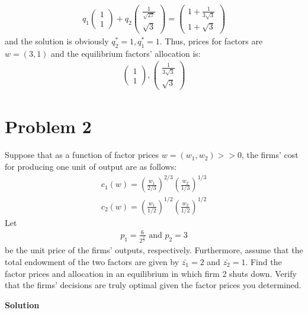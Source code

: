 \documentclass[a4paper]{article}
\begin{document}
\begin{align*}
q_1 \begin{pmatrix}
1\\
1
\end{pmatrix} + q_2 \begin{pmatrix}
\frac{1}{\sqrt{27}}\\
\sqrt{3}
\end{pmatrix} = \begin{pmatrix}
1 + \frac{1}{3\sqrt{3}}\\
1 + \sqrt{3}
\end{pmatrix}
\end{align*}
and the solution is obviously $q_2^* = 1, q_1^* = 1$. Thus, prices for factors are $w = (3, 1)$ and the equilibrium factors' allocation is:
\begin{align*}
\begin{pmatrix}
1\\
1
\end{pmatrix}, \begin{pmatrix}
\frac{1}{3\sqrt{3}}\\
\sqrt{3}
\end{pmatrix}
\end{align*}

\section*{Problem 2}
Suppose that as a function of factor prices $w = (w_1, w_2) >> 0$, the firms' cost for producing
one unit of output are as follows:
\begin{align*}
c_1(w) = \left(\frac{w_1}{2/3}\right)^{2/3}\left(\frac{w_2}{1/3}\right)^{1/3}\\
c_2(w) = \left(\frac{w_1}{1/2}\right)^{1/2}\left(\frac{w_2}{1/2}\right)^{1/2}
\end{align*}
Let
\begin{align*}
p_1 = \frac{6}{2^{\frac{2}{3}}}\text{ and } p_2 = 3
\end{align*}
be the unit price of the firms' outputs, respectively. Furthermore, assume that the total
endowment of the two factors are given by $\bar{z_1} = 2$ and $\bar{z_2} = 1$. Find the factor prices and
allocation in an equilibrium in which firm 2 shuts down. Verify that the firms' decisions are
truly optimal given the factor prices you determined.



\textbf{Solution}
\end{document}
